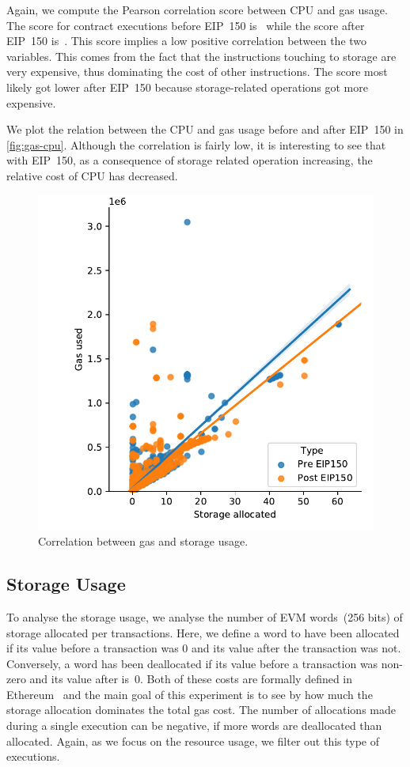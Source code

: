 Again, we compute the Pearson correlation score between CPU and gas usage. The score for contract executions before EIP~150 is~ while the score after EIP~150 is~. This score implies a low positive correlation between the two variables. This comes from the fact that the instructions touching to storage are very expensive, thus dominating the cost of other instructions. The score most likely got lower after EIP~150 because storage-related operations got more expensive.

We plot the relation between the CPU and gas usage before and after EIP~150 in \autoref{fig:gas-cpu}. Although the correlation is fairly low, it is interesting to see that with EIP~150, as a consequence of storage related operation increasing, the relative cost of CPU has decreased.

\begin{figure}[tb] \centering\includegraphics[width=.8\columnwidth]{figures/storage-usage-1400000-1500000--2500000-2600000.pdf}
  \caption{Correlation between gas and storage usage.}
  \label{fig:gas-storage}
\end{figure}

\subsection{Storage Usage}
To analyse the storage usage, we analyse the number of EVM words~(256 bits) of storage allocated per transactions. Here, we define a word to have been allocated if its value before a transaction was 0 and its value after the transaction was not. Conversely, a word has been deallocated if its value before a transaction was non-zero and its value after is~0. Both of these costs are formally defined in Ethereum~\cite{wood2014ethereum} and the main goal of this experiment is to see by how much the storage allocation dominates the total gas cost. The number of allocations made during a single execution can be negative, if more words are deallocated than allocated. Again, as we focus on the resource usage, we filter out this type of executions.

